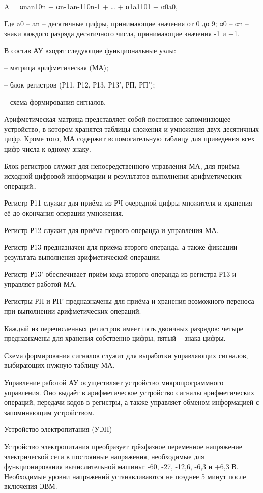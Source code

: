 \documentclass[11pt]{article}
\begin{document}
A = αnan10n + αn-1an-110n-1 + … + α1a1101 + α0a0,

Где a0 – an – десятичные цифры,
принимающие значения от 0 до 9; α0 – αn –
знаки каждого разряда десятичного
числа, принимающие значения -1 и +1.

В состав АУ входят следующие
функциональные узлы:

– матрица арифметическая (МА);

– блок регистров (Р11, Р12, Р13, Р13', РП, РП');

– схема формирования сигналов.

Арифметическая матрица представляет
собой постоянное запоминающее
устройство, в котором хранятся таблицы
сложения и умножения двух десятичных
цифр. Кроме того, МА содержит
вспомогательную таблицу для
приведения всех цифр числа к одному
знаку.

Блок регистров служит для
непосредственного управления МА, для
приёма исходной цифровой информации и
результатов выполнения арифметических
операций..

Регистр Р11 служит для приёма из РЧ
очередной цифры множителя и хранения
её до окончания операции умножения.

Регистр Р12 служит для приёма первого
операнда и управления МА.

Регистр Р13 предназначен для приёма
второго операнда, а также фиксации
результата выполнения арифметической
операции.

Регистр Р13' обеспечивает приём кода
второго операнда из регистра Р13 и
управляет работой МА.

Регистры РП и РП' предназначены для
приёма и хранения возможного переноса
при выполнении арифметических
операций.

Каждый из перечисленных регистров
имеет пять двоичных разрядов: четыре
предназначены для хранения собственно
цифры, пятый – знака цифры.

Схема формирования сигналов служит для
выработки управляющих сигналов,
выбирающих нужную таблицу МА.

Управление работой АУ осуществляет
устройство микропрограммного
управления. Оно выдаёт в
арифметическое устройство сигналы
арифметических операций, передачи
кодов в регистры, а также управляет
обменом информацией с запоминающим
устройством.

Устройство электропитания (УЭП)

Устройство электропитания преобразует
трёхфазное переменное напряжение
электрической сети в постоянные
напряжения, необходимые для
функционирования вычислительной
машины: -60, -27, -12,6, -6,3 и +6,3 В. Необходимые
уровни напряжений устанавливаются не
позднее 5 минут после включения ЭВМ.
\end{document}
